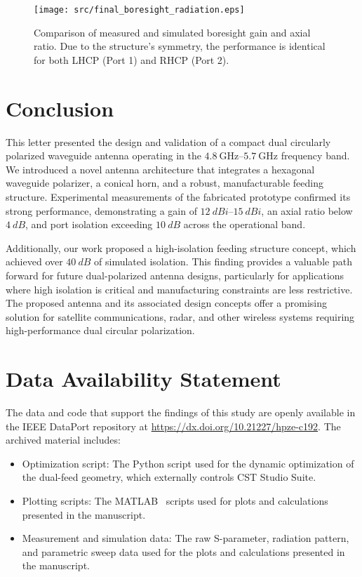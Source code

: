 \documentclass[journal]{IEEEtran}
\newcommand{\frequencyrange}{\qtyrange{4.8}{5.7}{\giga\hertz}}
\begin{document}
\begin{figure}[!b]
\centering
\texttt{[image: src/final\_boresight\_radiation.eps]}
\caption{\label{fig:final-boresight-radiation}Comparison of measured and simulated boresight gain and axial ratio. Due to the structure's symmetry, the performance is identical for both LHCP (Port 1) and RHCP (Port 2).}
\end{figure}


\section{Conclusion}
\label{sec:conclusion}

This letter presented the design and validation of a compact dual circularly polarized waveguide antenna operating in the $\frequencyrange$ frequency band. We introduced a novel antenna architecture that integrates a hexagonal waveguide polarizer, a conical horn, and a robust, manufacturable feeding structure. Experimental measurements of the fabricated prototype confirmed its strong performance, demonstrating a gain of $\qtyrange{12}{15}{dBi}$, an axial ratio below $\qty{4}{dB}$, and port isolation exceeding $\qty{10}{dB}$ across the operational band.

Additionally, our work proposed a high-isolation feeding structure concept, which achieved over $\qty{40}{dB}$ of simulated isolation. This finding provides a valuable path forward for future dual-polarized antenna designs, particularly for applications where high isolation is critical and manufacturing constraints are less restrictive. The proposed antenna and its associated design concepts offer a promising solution for satellite communications, radar, and other wireless systems requiring high-performance dual circular polarization.


\clearpage
\section*{Data Availability Statement}
\label{sec:data-availability-statement}

The data and code that support the findings of this study are openly available in the IEEE DataPort repository at \url{https://dx.doi.org/10.21227/hpze-c192}. The archived material includes:
\begin{itemize}
    \item Optimization script: The Python script used for the dynamic optimization of the dual-feed geometry, which externally controls CST Studio Suite.
    \item Plotting scripts: The MATLAB~\cite{matlab} scripts used for plots and calculations presented in the manuscript.
    \item Measurement and simulation data: The raw S-parameter, radiation pattern, and parametric sweep data used for the plots and calculations presented in the manuscript.
\end{itemize}
\end{document}
